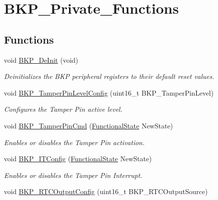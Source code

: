 \hypertarget{group___b_k_p___private___functions}{}\section{B\+K\+P\+\_\+\+Private\+\_\+\+Functions}
\label{group___b_k_p___private___functions}
\subsection*{Functions}
\begin{DoxyCompactItemize}
\item 
void \mbox{\hyperlink{group___b_k_p___private___functions_gaabff4d8f5ebf4fd9a840bcc9042ca226}{B\+K\+P\+\_\+\+De\+Init}} (void)
\begin{DoxyCompactList}\small\item\em Deinitializes the B\+KP peripheral registers to their default reset values. \end{DoxyCompactList}\item 
void \mbox{\hyperlink{group___b_k_p___private___functions_gae216446d641d075fb575ce6dbe2ff4c1}{B\+K\+P\+\_\+\+Tamper\+Pin\+Level\+Config}} (uint16\+\_\+t B\+K\+P\+\_\+\+Tamper\+Pin\+Level)
\begin{DoxyCompactList}\small\item\em Configures the Tamper Pin active level. \end{DoxyCompactList}\item 
void \mbox{\hyperlink{group___b_k_p___private___functions_ga3a0cdff9ad8238ade2c67e2b70f530ac}{B\+K\+P\+\_\+\+Tamper\+Pin\+Cmd}} (\mbox{\hyperlink{group___exported__types_gac9a7e9a35d2513ec15c3b537aaa4fba1}{Functional\+State}} New\+State)
\begin{DoxyCompactList}\small\item\em Enables or disables the Tamper Pin activation. \end{DoxyCompactList}\item 
void \mbox{\hyperlink{group___b_k_p___private___functions_gab8dbd0c4773f6edb98a28c8ff6a2ead0}{B\+K\+P\+\_\+\+I\+T\+Config}} (\mbox{\hyperlink{group___exported__types_gac9a7e9a35d2513ec15c3b537aaa4fba1}{Functional\+State}} New\+State)
\begin{DoxyCompactList}\small\item\em Enables or disables the Tamper Pin Interrupt. \end{DoxyCompactList}\item 
void \mbox{\hyperlink{group___b_k_p___private___functions_ga3d1b22b3c6a79f7b423616a0af1885bf}{B\+K\+P\+\_\+\+R\+T\+C\+Output\+Config}} (uint16\+\_\+t B\+K\+P\+\_\+\+R\+T\+C\+Output\+Source)

\end{DoxyCompactItemize}
